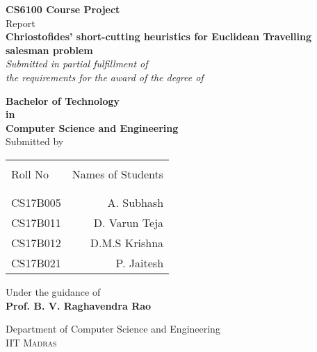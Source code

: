 \begin{titlepage}

       \begin{center}
       
       \textup{\small {\bf CS6100 Course Project} \\ Report}\\[0.2in]
       
       \Large \textbf {Chriostofides' short-cutting heuristics for Euclidean Travelling salesman problem}\\[0.5in]
       
              \small \emph{Submitted in partial fulfillment of\\
               the requirements for the award of the degree of}
               \vspace{.2in}
       
              {\bf Bachelor of Technology \\in\\ Computer Science and Engineering}\\[0.5in]
       
       \normalsize Submitted by \\
       \begin{table}[h]
       \centering
       \begin{tabular}{lr}\hline \\
       Roll No & Names of Students \\ \\ \hline
       \\
       CS17B005 & A. Subhash \\
       CS17B011 &  D. Varun Teja\\
       CS17B012 &  D.M.S Krishna\\
       CS17B021 &  P. Jaitesh\\\hline 
       \end{tabular}
       \end{table}
       
       \vspace{.1in}
       Under the guidance of\\
       {\textbf{Prof. B. V. Raghavendra Rao}}\\[0.2in]
       
       \vfill
       
       \Large{Department of Computer Science and Engineering}\\
       \normalsize
       \textsc{IIT Madras}\\
       
       \end{center}
       
       \end{titlepage}
       